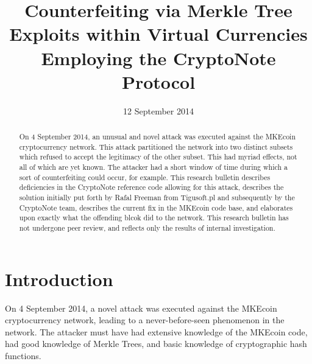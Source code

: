 \documentclass{mrl}
\begin{document}
\begin{frontmatter}

\begin{fmbox}
\hfill\setlength{\fboxrule}{0px}\setlength{\fboxsep}{5px}
\title{Counterfeiting via Merkle Tree Exploits within Virtual Currencies Employing the CryptoNote Protocol}
\date{12 September 2014}
\author[
   addressref={aff1},
]{ }
\author[
   addressref={mrl},
   email={lab@MKEcoin.cc}
]{ }
\author[
   addressref={mrl},
   email={lab@MKEcoin.cc}
]{ }
\author[
   addressref={mrl},
   email={lab@MKEcoin.cc}
]{ }


\address[id=aff1]{
}
\address[id=mrl]{
}
\end{fmbox}

\begin{abstractbox}
\begin{abstract}
On 4 September 2014, an unusual and novel attack was executed against the MKEcoin cryptocurrency network. This attack partitioned the network into two distinct subsets which refused to accept the legitimacy of the other subset. This had myriad effects, not all of which are yet known. The attacker had a short window of time during which a sort of counterfeiting could occur, for example.  This research bulletin describes deficiencies in the CryptoNote reference code allowing for this attack, describes the solution initially put forth by Rafal Freeman from Tigusoft.pl and subsequently by the CryptoNote team, describes the current fix in the MKEcoin code base, and elaborates upon exactly what the offending blcok did to the network.
This research bulletin has not undergone peer review, and reflects only the results of internal investigation.
\end{abstract}
\end{abstractbox}

\end{frontmatter}

\section{Introduction}
On 4 September 2014, a novel attack was executed against the MKEcoin cryptocurrency network, leading to a never-before-seen phenomenon in the network. The attacker must have had extensive knowledge of the MKEcoin code, had good knowledge of Merkle Trees, and basic knowledge of cryptographic hash functions. 
\end{document}
